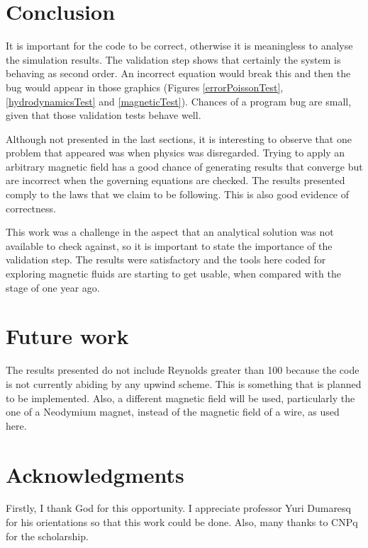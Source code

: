 \documentclass[journal]{IEEEtran}
\begin{document}
\section{Conclusion}

It is important for the code to be correct, otherwise it is meaningless to analyse the simulation results. The validation step shows that certainly the system is behaving as second order. An incorrect equation would break this and then the bug would appear in those graphics (Figures \ref{errorPoissonTest}, \ref{hydrodynamicsTest} and \ref{magneticTest}). Chances of a program bug are small, given that those validation tests behave well.

Although not presented in the last sections, it is interesting to observe that one problem that appeared was when physics was disregarded. Trying to apply an arbitrary magnetic field has a good chance of generating results that converge but are incorrect when the governing equations are checked. The results presented comply to the laws that we claim to be following. This is also good evidence of correctness.

This work was a challenge in the aspect that an analytical solution was not available to check against, so it is important to state the importance of the validation step. The results were satisfactory and the tools here coded for exploring magnetic fluids are starting to get usable, when compared with the stage of one year ago.


\section{Future work}
The results presented do not include Reynolds greater than 100 because the code is not currently abiding by any upwind scheme. This is something that is planned to be implemented. Also, a different magnetic field will be used, particularly the one of a Neodymium magnet, instead of the magnetic field of a wire, as used here.




\section*{Acknowledgments}

Firstly, I thank God for this opportunity. I appreciate professor Yuri Dumaresq for his orientations so that this work could be done. Also, many thanks to CNPq for the scholarship.




\end{document}
